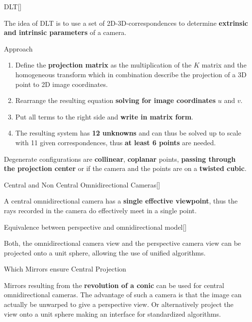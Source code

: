 \documentclass[10pt,a4paper]{scrartcl}
\begin{document}
\begin{multicols*}{2}
\begin{QandA}{DLT}[\Derivation]
\item The idea of DLT is to use a set of 2D-3D-correspondences to determine \textbf{extrinsic and intrinsic parameters} of a camera.
\item Approach
\begin{enumerate}
\item Define the \textbf{projection matrix} as the multiplication of the $K$ matrix and the homogeneous transform which in combination describe the projection of a 3D point to 2D image coordinates.
\item Rearrange the resulting equation \textbf{solving for image coordinates} $u$ and $v$.
\item Put all terms to the right side and \textbf{write in matrix form}.
\item The resulting system has \textbf{12 unknowns} and can thus be solved up to scale with 11 given correspondences, thus \textbf{at least 6 points} are needed.
\end{enumerate}
\item Degenerate configurations are \textbf{collinear}, \textbf{coplanar} points, \textbf{passing through the projection center} or if the camera and the points are on a \textbf{twisted cubic}.
\end{QandA}

\begin{QandA}{Central and Non Central Omnidirectional Cameras}[\Definition]
\item A central omnidirectional camera has a \textbf{single effective viewpoint}, thus the rays recorded in the camera do effectively meet in a single point.
\end{QandA}

\begin{QandA}{Equivalence between perspective and omnidirectional model}[\Application]
\item Both, the omnidirectional camera view and the perspective camera view can be projected onto a unit sphere, allowing the use of unified algorithms.
\end{QandA}

\begin{QandA}{Which Mirrors ensure Central Projection}
\item Mirrors resulting from the \textbf{revolution of a conic} can be used for central omnidirectional cameras. The advantage of such a camera is that the image can actually be unwarped to give a perspective view. Or alternatively project the view onto a unit sphere making an interface for standardized algorithms.
\end{QandA}


\end{multicols*}
\end{document}
